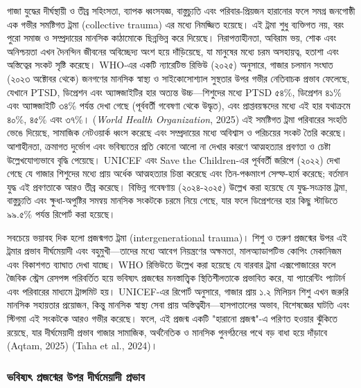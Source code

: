 গাজা যুদ্ধের দীর্ঘস্থায়ী ও তীব্র সহিংসতা, ব্যাপক ধ্বংসযজ্ঞ, বাস্তুচ্যুতি এবং
পরিবার-প্রিয়জন হারানোর ফলে সমগ্র জনগোষ্ঠী এক গভীর সমষ্টিগত ট্রমা (collective
trauma) এর মধ্যে নিমজ্জিত হয়েছে। এই ট্রমা শুধু ব্যক্তিগত নয়, বরং পুরো সমাজ ও
সম্প্রদায়ের মানসিক কাঠামোকে ছিন্নভিন্ন করে দিয়েছে। নিরাপত্তাহীনতা, অবিরাম ভয়,
শোক এবং অনিশ্চয়তা এখন দৈনন্দিন জীবনের অবিচ্ছেদ্য অংশ হয়ে দাঁড়িয়েছে, যা মানুষের
মধ্যে চরম অসহায়ত্ব, হতাশা এবং অস্তিত্বের সংকট সৃষ্টি করেছে। WHO-এর একটি
ন্যারেটিভ রিভিউ (২০২৫) অনুসারে, গাজার চলমান সংঘাত (২০২৩ অক্টোবর থেকে)
জনগণের মানসিক স্বাস্থ্য ও সাইকোসোশ্যাল সুস্থতার উপর গভীর নেতিবাচক প্রভাব
ফেলেছে, যেখানে PTSD, ডিপ্রেশন এবং অ্যাঙ্গজাইটির হার অত্যন্ত উচ্চ---শিশুদের মধ্যে
PTSD ৫৪\%, ডিপ্রেশন ৪১\% এবং অ্যাঙ্গজাইটি ৩৪\% পর্যন্ত দেখা গেছে (পূর্ববর্তী
গবেষণা থেকে উদ্ধৃত), এবং প্রাপ্তবয়স্কদের মধ্যে এই হার যথাক্রমে ৪০\%, ৪৫\% এবং
৩৭\%। (\emph{World Health Organization}, 2025)
 এই সমষ্টিগত ট্রমা পরিবারের সংহতি ভেঙে দিয়েছে, সামাজিক নেটওয়ার্ক ধ্বংস
করেছে এবং সম্প্রদায়ের মধ্যে অবিশ্বাস ও পরিচয়ের সংকট তৈরি করেছে। আশাহীনতা,
ক্রমাগত দুর্ভোগ এবং ভবিষ্যতের প্রতি কোনো আলো না দেখার কারণে আত্মহত্যার প্রবণতা ও
চেষ্টা উল্লেখযোগ্যভাবে বৃদ্ধি পেয়েছে। UNICEF এবং Save the Children-এর পূর্ববর্তী
জরিপে (২০২২) দেখা গেছে যে গাজার শিশুদের মধ্যে প্রায় অর্ধেক আত্মহত্যার চিন্তা
করেছে এবং তিন-পঞ্চমাংশ সেল্ফ-হার্ম করেছে; বর্তমান যুদ্ধ এই প্রবণতাকে আরও তীব্র
করেছে। বিভিন্ন গবেষণায় (২০২৪-২০২৫) উল্লেখ করা হয়েছে যে যুদ্ধ-সংক্রান্ত ট্রমা,
বাস্তুচ্যুতি এবং ক্ষুধা-অপুষ্টির সমন্বয় মানসিক সংকটকে চরমে নিয়ে গেছে, যার ফলে
ডিপ্রেশনের হার কিছু স্টাডিতে ৯৯.৫\% পর্যন্ত রিপোর্ট করা হয়েছে।

সবচেয়ে ভয়াবহ দিক হলো প্রজন্মগত ট্রমা (intergenerational trauma)। শিশু ও তরুণ
প্রজন্মের উপর এই ট্রমার প্রভাব দীর্ঘমেয়াদী এবং বহুমুখী---তাদের মধ্যে আবেগ
নিয়ন্ত্রণের অক্ষমতা, মালঅ্যাডাপটিভ কোপিং মেকানিজম এবং বিকাশগত ব্যাঘাত দেখা
যাচ্ছে। WHO রিভিউতে উল্লেখ করা হয়েছে যে বারবার ট্রমা এক্সপোজারের ফলে জৈবিক
স্ট্রেস রেসপন্স পরিবর্তিত হয়ে ভবিষ্যৎ প্রজন্মের মনস্তাত্ত্বিক স্থিতিশীলতাকে প্রভাবিত
করে, যা প্যারেন্টিং প্যাটার্ন এবং পরিবারের মাধ্যমে ট্রান্সমিট হয়। UNICEF-এর
রিপোর্ট অনুসারে, গাজার প্রায় ১.২ মিলিয়ন শিশু এখন জরুরি মানসিক সহায়তার প্রয়োজন,
কিন্তু মানসিক স্বাস্থ্য সেবা প্রায় অস্তিত্বহীন---হাসপাতালের অভাব, বিশেষজ্ঞের
ঘাটতি এবং স্টিগমা এই সংকটকে আরও গভীর করেছে। ফলে, এই প্রজন্ম একটি "হারানো
প্রজন্ম"-এ পরিণত হওয়ার ঝুঁকিতে রয়েছে, যার দীর্ঘমেয়াদী প্রভাব গাজার সামাজিক,
অর্থনৈতিক ও মানসিক পুনর্গঠনের পথে বড় বাধা হয়ে দাঁড়াবে (Aqtam, 2025) (Taha et
al., 2024)।

\subsubsection{ভবিষ্যৎ প্রজন্মের উপর দীর্ঘমেয়াদী
প্রভাব}\label{ux9adux9acux9b7ux9afux9ce-ux9aaux9b0ux99cux9a8ux9aeux9b0-ux989ux9aaux9b0-ux9a6ux9b0ux998ux9aeux9dfux9a6-ux9aaux9b0ux9adux9ac}

